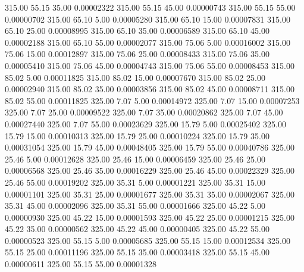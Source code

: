     315.00     55.15     35.00     0.00002322
    315.00     55.15     45.00     0.00000743
    315.00     55.15     55.00     0.00000702
    315.00     65.10      5.00     0.00005280
    315.00     65.10     15.00     0.00007831
    315.00     65.10     25.00     0.00008995
    315.00     65.10     35.00     0.00006589
    315.00     65.10     45.00     0.00002188
    315.00     65.10     55.00     0.00002077
    315.00     75.06      5.00     0.00016002
    315.00     75.06     15.00     0.00012897
    315.00     75.06     25.00     0.00008433
    315.00     75.06     35.00     0.00005410
    315.00     75.06     45.00     0.00004743
    315.00     75.06     55.00     0.00008453
    315.00     85.02      5.00     0.00011825
    315.00     85.02     15.00     0.00007670
    315.00     85.02     25.00     0.00002940
    315.00     85.02     35.00     0.00003856
    315.00     85.02     45.00     0.00008711
    315.00     85.02     55.00     0.00011825
    325.00      7.07      5.00     0.00014972
    325.00      7.07     15.00     0.00007253
    325.00      7.07     25.00     0.00009522
    325.00      7.07     35.00     0.00020862
    325.00      7.07     45.00     0.00027440
    325.00      7.07     55.00     0.00023629
    325.00     15.79      5.00     0.00025402
    325.00     15.79     15.00     0.00010313
    325.00     15.79     25.00     0.00010224
    325.00     15.79     35.00     0.00031054
    325.00     15.79     45.00     0.00048405
    325.00     15.79     55.00     0.00040786
    325.00     25.46      5.00     0.00012628
    325.00     25.46     15.00     0.00006459
    325.00     25.46     25.00     0.00006568
    325.00     25.46     35.00     0.00016229
    325.00     25.46     45.00     0.00022329
    325.00     25.46     55.00     0.00019202
    325.00     35.31      5.00     0.00001221
    325.00     35.31     15.00     0.00001101
    325.00     35.31     25.00     0.00001677
    325.00     35.31     35.00     0.00002067
    325.00     35.31     45.00     0.00002096
    325.00     35.31     55.00     0.00001666
    325.00     45.22      5.00     0.00000930
    325.00     45.22     15.00     0.00001593
    325.00     45.22     25.00     0.00001215
    325.00     45.22     35.00     0.00000562
    325.00     45.22     45.00     0.00000405
    325.00     45.22     55.00     0.00000523
    325.00     55.15      5.00     0.00005685
    325.00     55.15     15.00     0.00012534
    325.00     55.15     25.00     0.00011196
    325.00     55.15     35.00     0.00003418
    325.00     55.15     45.00     0.00000611
    325.00     55.15     55.00     0.00001328
